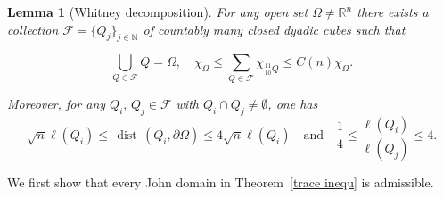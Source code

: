 \documentclass[reqno,11pt]{amsart}
\makeatletter
\def\dist{{\mathop\mathrm{\,dist\,}}}
\newcommand{\R}{\mathbb{R}}
\newtheorem{lem}[thm]{Lemma}%
\numberwithin{equation}{section}
\theoremstyle{remark}
\makeatother
\begin{document}
\begin{lem}[Whitney decomposition]\label{lma:whitney}
 For any open set $\Omega \neq \R^n$ there exists a collection
 $\mathscr F=\{Q_j\}_{j\in\mathbb N}$ of countably many closed dyadic cubes such that

 \begin{equation}\label{whitney cover v}
    \bigcup_{Q\in \mathscr{F}}Q=\Omega, \quad \chi_\Omega\le \sum_{Q\in\mathscr{F}}\chi_{\frac{11}{10}Q}\le C(n)\chi_\Omega.
\end{equation}

Moreover, for any $Q_i,\,Q_j\in\mathscr{F}$ with $Q_i\cap Q_j\neq \emptyset$, one has 
\begin{equation}\label{neig cube}
    \sqrt{n}\ell(Q_i)\le \dist(Q_i,\partial\Omega)\le 4\sqrt{n}\ell(Q_i)\quad\text{and}\quad \frac{1}{4}\le \frac{\ell(Q_i)}{\ell(Q_j)}\le 4.
\end{equation}
\end{lem}





 We first show that every John domain in Theorem~\ref{trace inequ} is admissible. 
\end{document}
